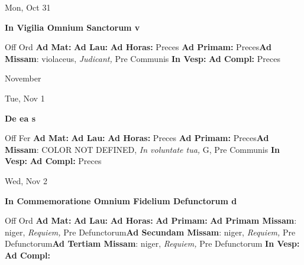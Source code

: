 \documentclass[10pt]{memoir}
\begin{document}
\begin{center}
\begin{minipage}{3.5in}
\vspace{2em}
\begin{center}Mon, Oct 31
\end{center}
\textbf{ \large In Vigilia Omnium Sanctorum
\textnormal{\normalsize v}}

\begin{justify}Off Ord
\textbf{Ad Mat: }
\textbf{Ad Lau: }
\textbf{Ad Horas: }Preces
\textbf{Ad Primam: }Preces\textbf{Ad Missam}: violaceus, \textit{Judicant,} Pre Communis
\textbf{In Vesp: }
\textbf{Ad Compl: }Preces
\end{justify}
\end{minipage}
\end{center}

\begin{center}
\pagebreak
\thispagestyle{empty}
{\Huge November}
\end{center}
                    
\begin{center}
\begin{minipage}{3.5in}
\vspace{2em}
\begin{center}Tue, Nov 1
\end{center}
\textbf{ \large De ea
\textnormal{\normalsize s}}

\begin{justify}Off Fer
\textbf{Ad Mat: }
\textbf{Ad Lau: }
\textbf{Ad Horas: }Preces
\textbf{Ad Primam: }Preces\textbf{Ad Missam}: COLOR NOT DEFINED, \textit{In voluntate tua,} G, Pre Communis
\textbf{In Vesp: }
\textbf{Ad Compl: }Preces
\end{justify}
\end{minipage}
\end{center}

\begin{center}
\begin{minipage}{3.5in}
\vspace{2em}
\begin{center}Wed, Nov 2
\end{center}
\textbf{ \large In Commemoratione Omnium Fidelium Defunctorum
\textnormal{\normalsize d}}

\begin{justify}Off Ord
\textbf{Ad Mat: }
\textbf{Ad Lau: }
\textbf{Ad Horas: }
\textbf{Ad Primam: }\textbf{Ad Primam Missam}: niger, \textit{Requiem,} Pre Defunctorum\textbf{Ad Secundam Missam}: niger, \textit{Requiem,} Pre Defunctorum\textbf{Ad Tertiam Missam}: niger, \textit{Requiem,} Pre Defunctorum
\textbf{In Vesp: }
\textbf{Ad Compl: }
\end{justify}
\end{minipage}
\end{center}
\end{document}
